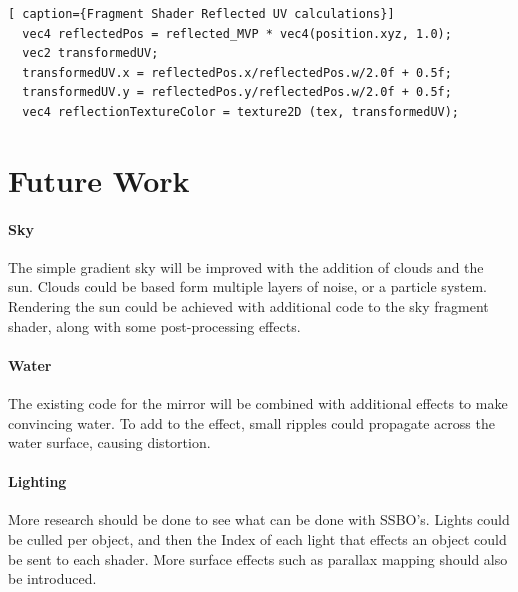 \documentclass[conference]{acmsiggraph}
\begin{document}
\begin{lstlisting}[ caption={Fragment Shader Reflected UV calculations}]
  vec4 reflectedPos = reflected_MVP * vec4(position.xyz, 1.0);
  vec2 transformedUV;
  transformedUV.x = reflectedPos.x/reflectedPos.w/2.0f + 0.5f;
  transformedUV.y = reflectedPos.y/reflectedPos.w/2.0f + 0.5f;
  vec4 reflectionTextureColor = texture2D (tex, transformedUV);
\end{lstlisting}



\section{Future Work}

\paragraph{Sky}
The simple gradient sky will be improved with the addition of clouds and the sun. Clouds could be based form multiple layers of noise, or a particle system. Rendering the sun could be achieved with additional code to the sky fragment shader, along with some post-processing effects.

\paragraph{Water}
The existing code for the mirror will be combined with additional effects to make convincing water. To add to the effect, small ripples could propagate across the water surface, causing distortion.

\paragraph{Lighting}
More research should be done to see what can be done with SSBO's. Lights could be culled per object, and then the Index of each light that effects an object could be sent to each shader. More surface effects such as parallax mapping should also be introduced.



\end{document}
